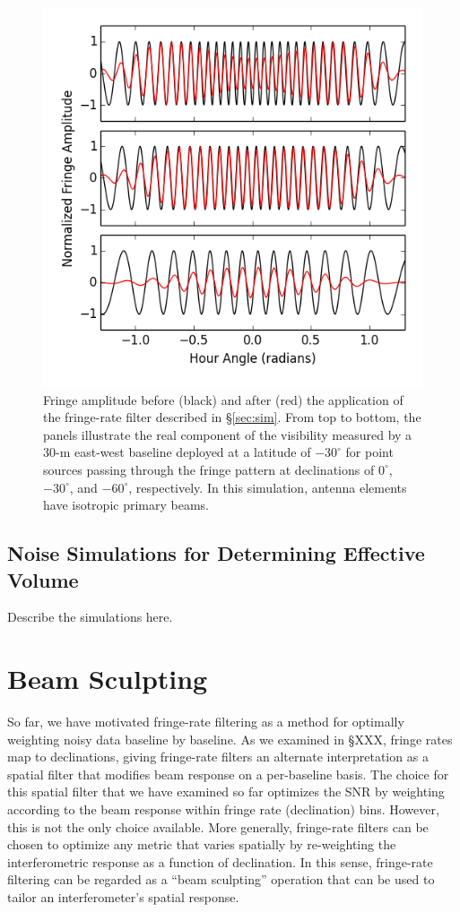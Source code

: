 \documentclass[twocolumn,apj,numberedappendix]{emulateapj}
\begin{document}
\begin{figure}\centering
\includegraphics[width=0.9\columnwidth]{plots/src_track.png}
\caption{
Fringe amplitude before (black) and after (red) the application
of the fringe-rate filter described in \S\ref{sec:sim}.  From top to bottom,
the panels illustrate the real component of the visibility measured by
a 30-m east-west baseline deployed at a latitude of $-30^\circ$ 
for point sources 
passing through the fringe pattern at declinations of $0^\circ$,
$-30^\circ$, and $-60^\circ$, respectively.  In this simulation,
antenna elements have isotropic primary beams.
}\label{fig:src_track}
\end{figure}

\subsection{Noise Simulations for Determining Effective Volume}
\label{sec:sim_nos}

Describe the simulations here.

\section{Beam Sculpting}
\label{sec:bmsculpt}

So far, we have motivated fringe-rate filtering as a method for optimally weighting noisy data baseline by baseline.
As we examined in \S XXX, fringe rates map to declinations, giving fringe-rate filters an alternate interpretation
as a spatial filter that modifies beam response on a per-baseline basis.  The choice for this spatial filter that we
have examined so far optimizes the SNR by weighting according to the beam response within fringe rate (declination) bins.  
However, this is not the only choice available.  More generally, fringe-rate filters can be chosen to optimize
any metric that varies spatially by re-weighting the interferometric response as a function of declination.  In this
sense, fringe-rate filtering can be regarded as a ``beam sculpting'' operation that can be used to tailor an interferometer's
spatial response.
\end{document}
